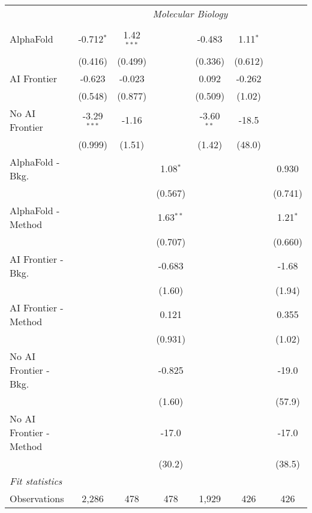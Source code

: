 \begin{tabular}{lcccccc}
 & \multicolumn{6}{c}{\textit{Molecular Biology}} \\ \\
   AlphaFold               & -0.712$^{*}$  & 1.42$^{***}$ &             & -0.483       & 1.11$^{*}$ &   \\   
                           & (0.416)       & (0.499)      &             & (0.336)      & (0.612)    &   \\   
   AI Frontier             & -0.623        & -0.023       &             & 0.092        & -0.262     &   \\   
                           & (0.548)       & (0.877)      &             & (0.509)      & (1.02)     &   \\   
   No AI Frontier          & -3.29$^{***}$ & -1.16        &             & -3.60$^{**}$ & -18.5      &   \\   
                           & (0.999)       & (1.51)       &             & (1.42)       & (48.0)     &   \\   
   AlphaFold - Bkg.        &               &              & 1.08$^{*}$  &              &            & 0.930\\   
                           &               &              & (0.567)     &              &            & (0.741)\\   
   AlphaFold - Method      &               &              & 1.63$^{**}$ &              &            & 1.21$^{*}$\\   
                           &               &              & (0.707)     &              &            & (0.660)\\   
   AI Frontier - Bkg.      &               &              & -0.683      &              &            & -1.68\\   
                           &               &              & (1.60)      &              &            & (1.94)\\   
   AI Frontier - Method    &               &              & 0.121       &              &            & 0.355\\   
                           &               &              & (0.931)     &              &            & (1.02)\\   
   No AI Frontier - Bkg.   &               &              & -0.825      &              &            & -19.0\\   
                           &               &              & (1.60)      &              &            & (57.9)\\   
   No AI Frontier - Method &               &              & -17.0       &              &            & -17.0\\   
                           &               &              & (30.2)      &              &            & (38.5)\\   
   \midrule
   \emph{Fit statistics}\\
   Observations            & 2,286         & 478          & 478         & 1,929        & 426        & 426\\  
   

\end{tabular}
